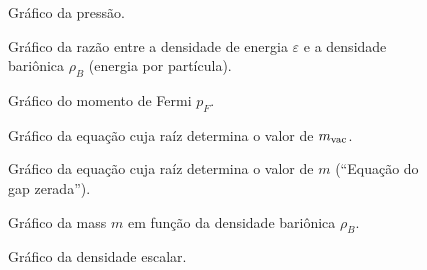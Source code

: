 \begin{figure}
	
	\caption{Gráfico da pressão. \protect}
	\label{Fig:pressure_NJL-Buballa_Set_1}
\end{figure}

\begin{figure}
	
	\caption{Gráfico da razão entre a densidade de energia $\varepsilon$ e a densidade bariônica $\rho_B$ (energia por partícula). \protect}
	\label{Fig:energy_density_per_particle_NJL-Buballa_Set_1}
\end{figure}

\FloatBarrier


\begin{figure}
	
	\caption{Gráfico do momento de Fermi $p_F$. \protect}
	\label{Fig:fermi_momentum_NJL-D_1}
\end{figure}

\begin{figure}
	
	\caption{Gráfico da equação cuja raíz determina o valor de $m_{\rm{vac}}$. \protect}
	\label{Fig:vacuum_mass_equation_NJL-D_1}
\end{figure}

\begin{figure}
	
	\caption{Gráfico da equação cuja raíz determina o valor de $m$ (``Equação do gap zerada''). \protect}
	\label{Fig:gap_NJL-D_1}
\end{figure}

\begin{figure}
	
	\caption{Gráfico da mass $m$ em função da densidade bariônica $\rho_B$. \protect}
	\label{Fig:mass_NJL-D_1}
\end{figure}


\begin{figure}
	
	\caption{Gráfico da densidade escalar. \protect}
	\label{Fig:scalar_density_NJL-D_1}
\end{figure}


